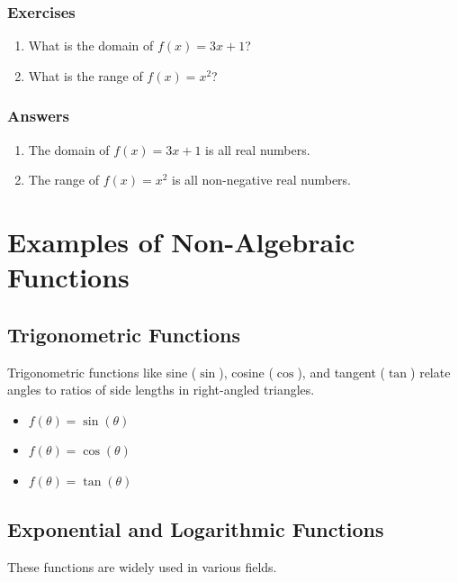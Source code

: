 \documentclass[12pt]{article}
\begin{document}
\subsubsection*{Exercises}

\begin{enumerate}
    \item What is the domain of \( f(x) = 3x + 1 \)?
    \item What is the range of \( f(x) = x^2 \)?
\end{enumerate}

\subsubsection*{Answers}

\begin{enumerate}
    \item The domain of \( f(x) = 3x + 1 \) is all real numbers.
    \item The range of \( f(x) = x^2 \) is all non-negative real numbers.
\end{enumerate}

\newpage

\section*{Examples of Non-Algebraic Functions}

\subsection*{Trigonometric Functions}

Trigonometric functions like sine (\(\sin\)), cosine (\(\cos\)), and tangent (\(\tan\)) relate angles to ratios of side lengths in right-angled triangles.

\begin{itemize}
    \item \( f(\theta) = \sin(\theta) \)
    \item \( f(\theta) = \cos(\theta) \)
    \item \( f(\theta) = \tan(\theta) \)
\end{itemize}

\subsection*{Exponential and Logarithmic Functions}

These functions are widely used in various fields.
\end{document}
